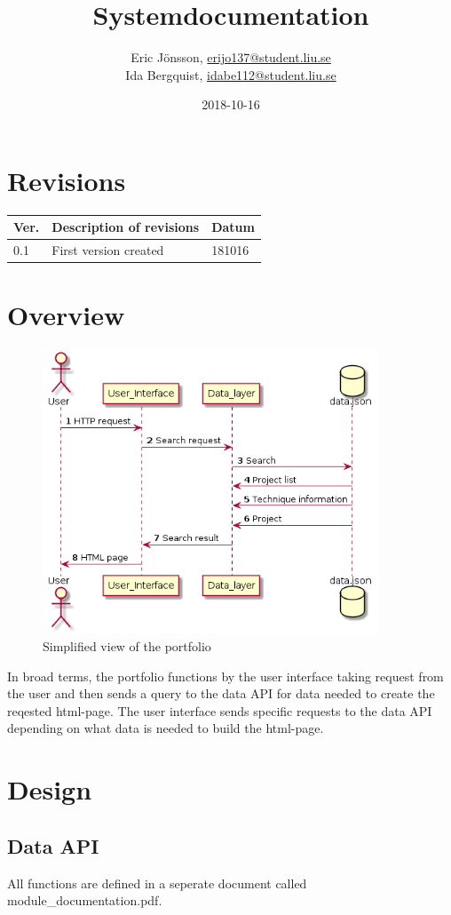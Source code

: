 \documentclass{TDP003mall}
\author{Eric Jönsson, \url{erijo137@student.liu.se}\\
  Ida Bergquist, \url{idabe112@student.liu.se}}
\title{Systemdocumentation}
\date{2018-10-16}
\begin{document}
\projectpage
\tableofcontents
\newpage
\section{Revisions}
\begin{table}[!h]
\begin{tabularx}{\linewidth}{|l|X|l|}
\hline
\textbf{Ver.} & \textbf{Description of revisions} & \textbf{Datum} \\\hline
0.1 & First version created & 181016 \\\hline
\end{tabularx}
\end{table}

\section{Overview}
\begin{figure}[h!]
    \centering
    \includegraphics[width=10cm]{sevenskdiagram.png}
    \caption{Simplified view of the portfolio}
    \label{sekvensdiagram}
\end{figure}
In broad terms, the portfolio functions by the user interface taking request from the user and then sends a query to the data API for data needed to create the reqested html-page.
The user interface sends specific requests to the data API depending on what data is needed to build the html-page.
\section{Design}
\subsection{Data API}
All functions are defined in a seperate document called module\_documentation.pdf.
\end{document}
